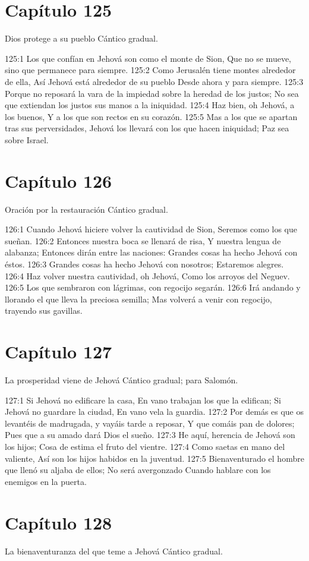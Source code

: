 \section*{Capítulo 125}
Dios protege a su pueblo 
Cántico gradual. 
 
125:1 Los que confían en Jehová son como el monte de Sion, 
Que no se mueve, sino que permanece para siempre. 
125:2 Como Jerusalén tiene montes alrededor de ella, 
Así Jehová está alrededor de su pueblo 
Desde ahora y para siempre. 
125:3 Porque no reposará la vara de la impiedad sobre la heredad de los justos; 
No sea que extiendan los justos sus manos a la iniquidad. 
125:4 Haz bien, oh Jehová, a los buenos, 
Y a los que son rectos en su corazón. 
125:5 Mas a los que se apartan tras sus perversidades, 
Jehová los llevará con los que hacen iniquidad; 
Paz sea sobre Israel. 
\section*{Capítulo 126}
Oración por la restauración 
Cántico gradual. 
 
126:1 Cuando Jehová hiciere volver la cautividad de Sion, 
Seremos como los que sueñan. 
126:2 Entonces nuestra boca se llenará de risa, 
Y nuestra lengua de alabanza; 
Entonces dirán entre las naciones: 
Grandes cosas ha hecho Jehová con éstos. 
126:3 Grandes cosas ha hecho Jehová con nosotros; 
Estaremos alegres. 
126:4 Haz volver nuestra cautividad, oh Jehová, 
Como los arroyos del Neguev. 
126:5 Los que sembraron con lágrimas, con regocijo segarán. 
126:6 Irá andando y llorando el que lleva la preciosa semilla; 
Mas volverá a venir con regocijo, trayendo sus gavillas. 
\section*{Capítulo 127}
La prosperidad viene de Jehová 
Cántico gradual; para Salomón. 
 
127:1 Si Jehová no edificare la casa, 
En vano trabajan los que la edifican; 
Si Jehová no guardare la ciudad, 
En vano vela la guardia. 
127:2 Por demás es que os levantéis de madrugada, y vayáis tarde a reposar, 
Y que comáis pan de dolores; 
Pues que a su amado dará Dios el sueño. 
127:3 He aquí, herencia de Jehová son los hijos; 
Cosa de estima el fruto del vientre. 
127:4 Como saetas en mano del valiente, 
Así son los hijos habidos en la juventud. 
127:5 Bienaventurado el hombre que llenó su aljaba de ellos; 
No será avergonzado 
Cuando hablare con los enemigos en la puerta. 
\section*{Capítulo 128}
La bienaventuranza del que teme a Jehová 
Cántico gradual. 
 
